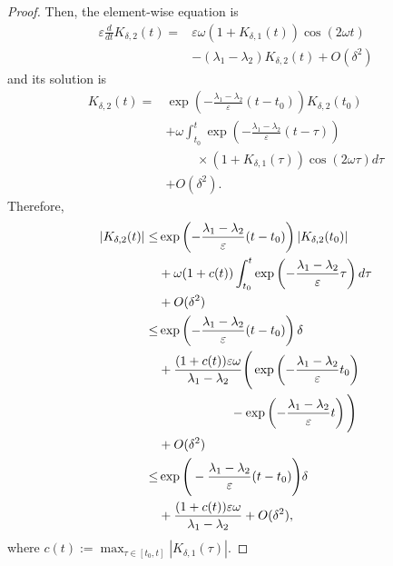 \documentclass[fleqn,10pt]{SICE_FES26}
\begin{document}
\begin{proof}
    Then, the element-wise equation is 
    \begin{align*}
    \varepsilon \frac{d}{dt} K_{\delta , 2}(t) =&
     \varepsilon \omega (1+K_{\delta , 1}(t))
     \cos (2\omega t)
     \\ & 
    -(\lambda _{1} - \lambda _{2})
     K_{\delta,2}(t)
    + O (\delta ^2) 
    \end{align*}
    and its solution is
    \begin{align*}
    K_{\delta,2} (t) = & \exp \left( -\frac{\lambda _{1} - \lambda _{2}}{\varepsilon}(t-t_{0}) \right) K_{\delta,2}(t_{0})
    \\ &
    +
    \omega \int _{t_{0}}^{t} \exp \left( -\frac{\lambda _{1} - \lambda _{2}}{\varepsilon} (t- \tau ) \right) 
    \\ & \hspace{1cm}
    \times (1+ K_{\delta ,1}(\tau )) \cos (2\omega \tau ) d\tau 
    \\ & 
    + O (\delta ^2  ) 
    .
    \end{align*}
    Therefore, 
    \begin{align*}
    | K_{\delta,2} (t) | \leq &  \exp \left( -\frac{\lambda _{1} - \lambda _{2}}{\varepsilon}(t-t_{0}) \right) |K_{\delta,2}(t_{0}) |
    \\ & 
    +
    \omega (1 + c(t) ) \int _{t_{0}}^{t} \exp \left( -\frac{\lambda _{1} - \lambda _{2}}{\varepsilon}\tau \right) d\tau 
    \\ & + O (\delta ^2  ) 
    \\
    \leq &
    \exp \left( -\frac{\lambda _{1} - \lambda _{2}}{\varepsilon}(t-t_{0}) \right) \delta 
    \\ & 
    +
    \frac{(1 + c(t) )\varepsilon \omega }{\lambda _{1} - \lambda _{2}} 
    \Bigg{(} 
    \exp \left( -\frac{\lambda _{1} - \lambda _{2}}{\varepsilon}t_{0} \right)
    \\ & \hspace{2cm}
    -
    \exp \left( -\frac{\lambda _{1} - \lambda _{2}}{\varepsilon}t \right)
    \Bigg{)}
    \\ & 
    + O (\delta ^2  ) 
    \\
    \leq &
    \exp \Bigg{(} -\frac{\lambda _{1} 
    - \lambda _{2}}{\varepsilon}(t-t_{0}) \Bigg{)} \delta 
    \\ &
    +
    \frac{(1+c(t))\varepsilon \omega }{\lambda _{1} - \lambda _{2}} 
    + O (\delta ^2  ) ,
    \end{align*}
    where $c(t) := \max _{\tau \in [t_{0},t]} |K_{\delta ,1}(\tau)|$. 

\end{proof}
\end{document}
